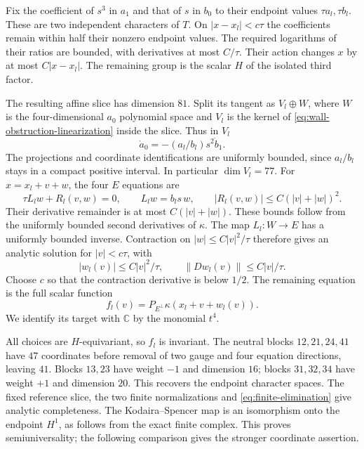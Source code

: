 \documentclass[11pt]{amsart}
\theoremstyle{definition}
\theoremstyle{remark}
\newcommand{\CC}{\mathbb C}
\begin{document}
Fix the coefficient of $s^3$ in $a_1$ and that of $s$ in $b_0$
to their endpoint values $\tau a_l,\tau b_l$. These are two
independent characters of $T$. On $|x-x_l|<c\tau$ the coefficients
remain within half their nonzero endpoint values. The required
logarithms of their ratios are bounded, with derivatives at most
$C/\tau$. Their action changes $x$ by at most $C|x-x_l|$.
The remaining group is the scalar $H$ of the isolated third factor.

The resulting affine slice has dimension $81$. Split its tangent as
$V_l\oplus W$, where $W$ is the four-dimensional $a_0$ polynomial
space and $V_l$ is the kernel of \eqref{eq:wall-obstruction-linearization}
inside the slice. Thus in $V_l$
\[
 \dot a_0=-(a_l/b_l)s^2\dot b_1.
\]
The projections and coordinate identifications are uniformly bounded,
since $a_l/b_l$ stays in a compact positive interval. In particular
$\dim V_l=77$. For $x=x_l+v+w$, the four $E$ equations are
\begin{equation}\label{eq:finite-elimination}
 \tau L_lw+R_l(v,w)=0,\qquad L_lw=b_ls\,w,
 \qquad |R_l(v,w)|\le C(|v|+|w|)^2.
\end{equation}
Their derivative remainder is at most $C(|v|+|w|)$.
These bounds follow from the uniformly bounded second derivatives of
$\kappa$. The map $L_l:W\to E$ has a uniformly bounded inverse.
Contraction on $|w|\le C|v|^2/\tau$ therefore gives an analytic
solution for $|v|<c\tau$, with
\begin{equation}\label{eq:finite-elimination-bounds}
 |w_l(v)|\le C|v|^2/\tau,\qquad
 \|Dw_l(v)\|\le C|v|/\tau.
\end{equation}
Choose $c$ so that the contraction derivative is below $1/2$.
The remaining equation is the full scalar function
\begin{equation}\label{eq:reduced-wall-equation}
 f_l(v)=P_{E^\perp}\kappa(x_l+v+w_l(v)).
\end{equation}
We identify its target with $\CC$ by the monomial $t^4$.

All choices are $H$-equivariant, so $f_l$ is invariant. The neutral
blocks $12,21,24,41$ have $47$ coordinates before removal of two
gauge and four equation directions, leaving $41$. Blocks $13,23$
have weight $-1$ and dimension $16$; blocks $31,32,34$ have weight
$+1$ and dimension $20$. This recovers the endpoint character spaces.
The fixed reference slice, the two finite normalizations and
\eqref{eq:finite-elimination} give analytic completeness. The
Kodaira--Spencer map is an isomorphism onto the endpoint $H^1$,
as follows from the exact finite complex. This proves semiuniversality;
the following comparison gives the stronger coordinate assertion.
\end{document}
